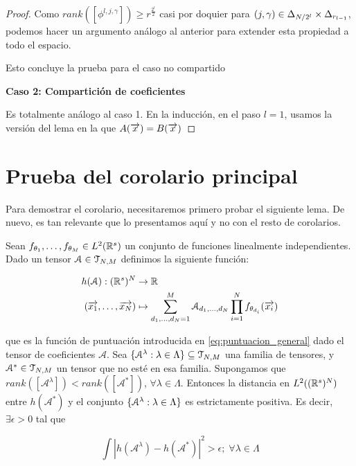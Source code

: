 \begin{proof}
    Como $rank([\phi^{l, j, \gamma}]) \geq r^{\frac{2^l}{2}}$ casi por doquier para $(j, \gamma) \in \Delta_{N/2^l} \times \Delta_{r_{l-1}}$, podemos hacer un argumento análogo al anterior para extender esta propiedad a todo el espacio.

    Esto concluye la prueba para el caso no compartido

    \textbf{Caso 2: Compartición de coeficientes}

    Es totalmente análogo al caso 1. En la inducción, en el paso $l = 1$, usamos la versión del lema  en la que $A(\overrightarrow{x}) = B(\overrightarrow{x})$
\end{proof}

\section{Prueba del corolario principal}

Para demostrar el corolario, necesitaremos primero probar el siguiente lema. De nuevo, es tan relevante que lo presentamos aquí y no con el resto de corolarios.

\begin{lema} \label{lema:lema_previo_corolario}
    Sean $f_{\theta_1}, \ldots, f_{\theta_M} \in L^2(\mathbb{R}^s)$ un conjunto de funciones linealmente independientes. Dado un tensor $\mathcal{A} \in \mathcal{T}_{N, M}$ definimos la siguiente función:

    \begin{equation}
    \begin{split}
        h(\mathcal{A}): (\mathbb{R}^s)^N &\to \mathbb{R} \\
        (\overrightarrow{x_1}, \ldots, \overrightarrow{x_N}) &\mapsto \sum_{d_1, \ldots, d_N = 1}^M \mathcal{A}_{d_1, \ldots, d_N} \prod_{i = 1}^N f_{\theta_{d_i}}(\overrightarrow{x_i})
    \end{split}
    \end{equation}

    que es la función de puntuación introducida en \eqref{eq:puntuacion_general} dado el tensor de coeficientes $\mathcal{A}$. Sea $\{ \mathcal{A}^\lambda: \lambda \in \Lambda \} \subseteq \mathcal{T}_{N, M}$ una familia de tensores, y $\mathcal{A}^* \in \mathcal{T}_{N, M}$ un tensor que no esté en esa familia. Supongamos que $rank([\mathcal{A}^\lambda]) < rank([\mathcal{A}^*])$, $\forall \lambda \in \Lambda$. Entonces la distancia en $L^2((\mathbb{R}^s)^N)$ entre $h(\mathcal{A}^*)$ y el conjunto $\{ \mathcal{A}^\lambda: \lambda \in \Lambda \}$ es estrictamente positiva. Es decir, $\exists \epsilon > 0$ tal que

    \begin{equation}
        \int |h(\mathcal{A}^\lambda) - h(\mathcal{A}^*)|^2 > \epsilon; \; \forall \lambda \in \Lambda
    \end{equation}
\end{lema}

